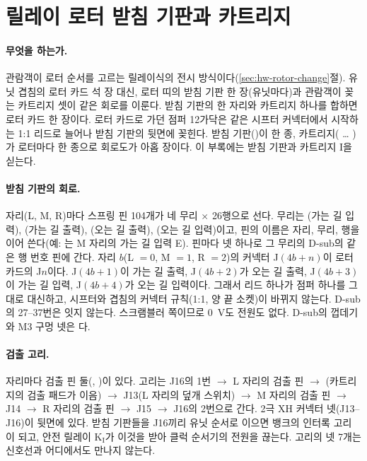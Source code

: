 
\section{릴레이 로터 받침 기판과 카트리지}\label{sch:rotor-cartridge}

\paragraph{무엇을 하는가.} 관람객이 로터 순서를 고르는 릴레이식의 전시 방식이다(\ref{sec:hw-rotor-change}절). 유닛
겹침의 로터 카드 석 장 대신, 로터 띠의 받침 기판 한 장(유닛마다)과 관람객이 꽂는 카트리지 셋이 같은 회로를 이룬다.
받침 기판의 한 자리와 카트리지 하나를 합하면 로터 카드 한 장이다. 로터 카드로 가던 점퍼 12가닥은 같은 시프터
커넥터에서 시작하는 1:1 리드로 늘어나 받침 기판의 뒷면에 꽂힌다. 받침 기판()이 한 종,
카트리지( \ldots{} )가 로터마다 한 종으로 회로도가 아홉 장이다. 이 부록에는 받침 기판과
카트리지 I을 싣는다.

\paragraph{받침 기판의 회로.} 자리(L, M, R)마다 스프링 핀 104개가 네 무리 $\times$ 26행으로 선다. 무리는 (가는
길 입력), (가는 길 출력), (오는 길 출력), (오는 길 입력)이고, 핀의 이름은 자리, 무리, 행을
이어 쓴다(예: 는 M 자리의 가는 길 입력 E). 핀마다 넷 하나로 그 무리의 D-sub의 같은 행 번호 핀에 간다. 자리
$b$(L $= 0$, M $= 1$, R $= 2$)의 커넥터 J$(4b+n)$이 로터 카드의 J$n$이다. J$(4b+1)$이 가는 길 출력, J$(4b+2)$가 오는 길
출력, J$(4b+3)$이 가는 길 입력, J$(4b+4)$가 오는 길 입력이다. 그래서 리드 하나가 점퍼 하나를 그대로 대신하고, 시프터와
겹침의 커넥터 규칙(1:1, 양 끝 소켓)이 바뀌지 않는다. D-sub의 27--37번은 잇지 않는다. 스크램블러 쪽이므로 0~V도 전원도
없다. D-sub의 껍데기와 M3 구멍 넷은 다.

\paragraph{검출 고리.} 자리마다 검출 핀 둘(, )이 있다. 고리는 J16의 1번 $\to$ L 자리의 검출 핀
$\to$ (카트리지의 검출 패드가 이음) $\to$ J13(L 자리의 덮개 스위치) $\to$ M 자리의 검출 핀 $\to$ J14 $\to$ R 자리의 검출 핀
$\to$ J15 $\to$ J16의 2번으로 간다. 2극 XH 커넥터 넷(J13--J16)이 뒷면에 있다. 받침 기판들을 J16끼리 유닛 순서로 이으면
뱅크의 인터록 고리 이 되고, 안전 릴레이 K$_\mathrm{I}$가 이것을 받아 클럭 순서기의 전원을 끊는다. 고리의 넷
7개는 신호선과 어디에서도 만나지 않는다.


